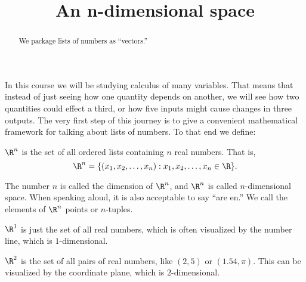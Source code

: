 \documentclass{ximera}
\title{An n-dimensional space}
\begin{document}
\begin{abstract}
  We package lists of numbers as ``vectors.''
\end{abstract}

In this course we will be studying calculus of many variables.  That
means that instead of just seeing how one quantity depends on another,
we will see how two quantities could effect a third, or how five
inputs might cause changes in three outputs.  The very first step of
this journey is to give a convenient mathematical framework for talking
about lists of numbers.  To that end we define:

\begin{definition}
  $\R^n$ is the set of all ordered lists containing $n$ real numbers.
  That is, \[\R^n = \{ (x_1,x_2,\dots, x_n) : x_1,x_2,\dots, x_n \in \R
  \}.\]
\end{definition}

The number $n$ is called the dimension of $\R^n$, and $\R^n$ is called $n$-dimensional space.  When speaking aloud, it is also acceptable to say ``are en.''
 We call the elements of $\R^n$ points or $n$-tuples.

\begin{example}
  $\R^1$ is just the set of all real numbers, which is often visualized by the number line, which is $1$-dimensional.
\end{example}

\begin{example}
	$\R^2$ is the set of all pairs of real numbers, like $(2,5)$ or $(1.54,\pi)$. This can be visualized by the coordinate plane, which is $2$-dimensional.
\end{example}
	
\end{document}
